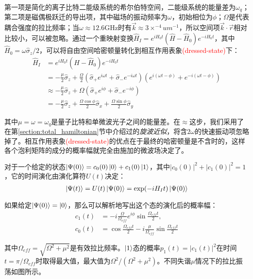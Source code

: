 第一项是简化的离子比特二能级系统的希尔伯特空间，二能级系统的能量差为$\omega_q$；第二项是磁偶极跃迁的导出项，其中磁场的振动频率为$\omega$，初始相位为$\phi$；$\Omega$是代表耦合强度的拉比频率；当$\omega\approx 12.6$GHz时有$\vec{k}\approx3\times ^{-4}um^{-1}$，所以空间项$\vec{k}\cdot \vec{r}$相对比较小，可以被忽略。通过一个重映射变换$\hat{H}_I=e^{iH_0t}(\hat{H}-\hat{H}_0)e^{-iH_0t}$，其中$\hat{H}_0=\omega\hat{\sigma}_z/2$，可以将自由空间哈密顿量转化到相互作用表象\textcolor{red}{(dressed-state)}下：
\begin{align}
    \hat{H}_I&=e^{iH_0t}(\hat{H}-\hat{H}_0)e^{-iH_0t}\\
    &=-\frac{\mu}{2}\hat{\sigma}_z+\frac{\Omega}{2}\left(\hat{\sigma}_+e^{i\omega t}+\hat{\sigma}_-e^{-i\omega t}\right)\left(e^{i(\omega t-\phi)}+e^{-i(\omega t-\phi)}\right)\\
    &\approx -\frac{\mu}{2}\hat{\sigma}_z+\Omega(\hat{\sigma}_+e^{i\phi}+\hat{\sigma}_-e^{-i\phi})\\
    &=-\frac{\mu}{2}\hat{\sigma}_z+\frac{\Omega\cos{\phi}}{2}\hat{\sigma}_x+\frac{\Omega\sin{\phi}}{2}\hat{\sigma}_y\label{eq:interaction_hamiltonian_microwave}
\end{align}

其中$\mu=\omega=\omega_q$是量子比特和单微波光子之间的能量差。在$\approx$这步，我们采用了在第\ref{section:total_hamiltonian}节中介绍过的\emph{旋波近似}，将含$2\omega$的快速振动项忽略掉了。相互作用表象\textcolor{red}{(dressed-state)}的优点在于最终的哈密顿量是不含时的，这样各个泡利矩阵的成分的概率幅就完全由施加的微波场决定了。

对于一个给定的状态$\ket{\Psi(0)}=c_0(0)\ket{0}+c_1(0)\ket{1}$，其中$|c_0(0)|^2+|c_1(0)|^2=1$，它的时间演化由演化算符$U(t)$决定：
\begin{align}
    \ket{\Psi(t)}=U(t)\ket{\Psi(0)}=\exp(-iH_It)\ket{\Psi(0)}
\end{align}

如果给定$\ket{\Psi(0)}=\ket{0}$，那么可以解析地写出这个态的演化后的概率幅：
\begin{align}
    c_1(t)&=-i\frac{\Omega}{\Omega_{eff}}e^{i\phi}\sin{\frac{\Omega_{eff}t}{2}},\\
    c_0(t)&=\cos{\frac{\Omega_{eff}t}{2}}-i\frac{\mu}{\Omega_{eff}}\sin{\frac{\Omega_{eff}t}{2}}
\end{align}

其中$\Omega_{eff}=\sqrt{\Omega^2+\mu^2}$是有效拉比频率\cite[]{Foot_2005}。$\ket{1}$态的概率$p_1(t)=|c_1(t)|^2$在时间$t=\pi/\Omega_{eff}$时取得最大值，最大值为$\Omega^2/(\Omega^2+\mu^2)$。不同失谐$\mu$情况下的拉比振荡如图所示。

